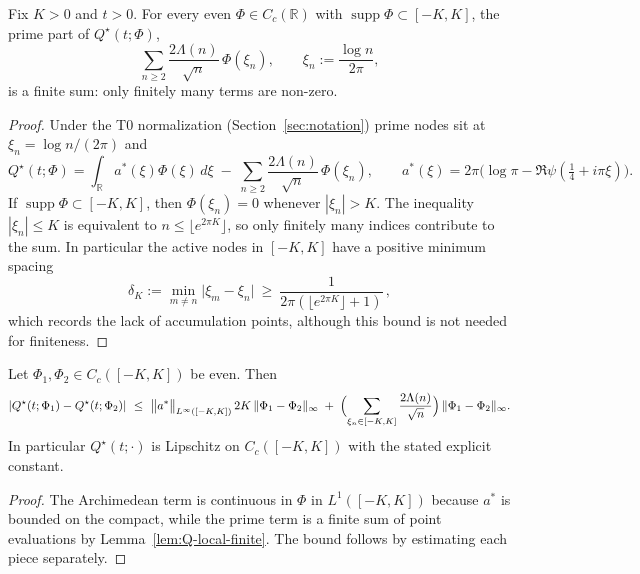 
\begin{lemma}\label{lem:Q-local-finite}
Fix $K>0$ and $t>0$. For every even $\Phi\in C_c(\mathbb{R})$ with $\operatorname{supp}\Phi\subset[-K,K]$, the prime part of $Q^\star(t;\Phi)$,
\[
\sum_{n\ge2}\frac{2\Lambda(n)}{\sqrt n}\,\Phi(\xi_n),\qquad \xi_n:=\frac{\log n}{2\pi},
\]
is a finite sum: only finitely many terms are non-zero.
\end{lemma}
\begin{proof}
Under the T0 normalization (Section~\ref{sec:notation}) prime nodes sit at $\xi_n=\log n/(2\pi)$ and
\[
Q^\star(t;\Phi)=\int_{\mathbb R} a^\ast(\xi)\Phi(\xi)\,d\xi\;-\;\sum_{n\ge2}\frac{2\Lambda(n)}{\sqrt n}\,\Phi(\xi_n),\qquad
a^\ast(\xi)=2\pi\bigl(\log\pi-\Re\psi(\tfrac14+i\pi\xi)\bigr).
\]
If $\operatorname{supp}\Phi\subset[-K,K]$, then $\Phi(\xi_n)=0$ whenever $|\xi_n|>K$. The inequality $|\xi_n|\le K$ is equivalent to $n\le\lfloor e^{2\pi K}\rfloor$, so only finitely many indices contribute to the sum. In particular the active nodes in $[-K,K]$ have a positive minimum spacing
\[
\delta_K:=\min_{m\ne n}\bigl|\xi_m-\xi_n\bigr|\ \ge\ \frac{1}{2\pi(\lfloor e^{2\pi K}\rfloor+1)}\,,
\]
which records the lack of accumulation points, although this bound is not needed for finiteness.
\end{proof}

\begin{corollary}\label{cor:A2-Lip}
Let $\Phi_1,\Phi_2\in C_c([-K,K])$ be even. Then
\[
|Q^\star(t;\Phi_1)-Q^\star(t;\Phi_2)|\ \le\
\bigl\|a^\ast\bigr\|_{L^\infty([-K,K])}\,2K\,\|\Phi_1-\Phi_2\|_\infty
\;+\;\Bigl(\sum_{\xi_n\in[-K,K]}\frac{2\Lambda(n)}{\sqrt n}\Bigr)\,\|\Phi_1-\Phi_2\|_\infty.
\]
In particular $Q^\star(t;\cdot)$ is Lipschitz on $C_c([-K,K])$ with the stated explicit constant.
\end{corollary}
\begin{proof}
The Archimedean term is continuous in $\Phi$ in $L^1([-K,K])$ because $a^\ast$ is bounded on the compact, while the prime term is a finite sum of point evaluations by Lemma~\ref{lem:Q-local-finite}. The bound follows by estimating each piece separately.
\end{proof}

